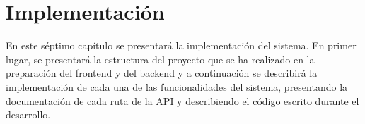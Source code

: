 \chapter{Implementación}
En este séptimo capítulo se presentará la implementación del sistema. En primer lugar, se presentará la estructura del proyecto que se ha realizado en la preparación del frontend y del backend y a continuación
se describirá la implementación de cada una de las funcionalidades del sistema, presentando la documentación de cada ruta de la API y describiendo el código escrito durante el desarrollo.
